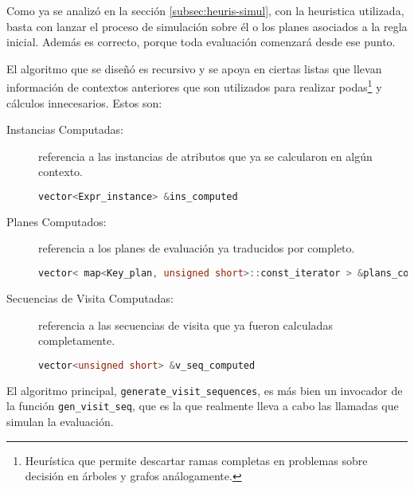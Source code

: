 Como ya se analizó en la sección \ref{subsec:heuris-simul}, con la heuristica utilizada,  basta con lanzar el proceso de simulación sobre él o los planes asociados a la regla inicial. Además es correcto, porque toda evaluación comenzará desde ese punto.

El algoritmo que se diseñó es recursivo y se apoya en ciertas listas que llevan información de contextos anteriores que son utilizados para realizar podas\footnote{Heurística que permite descartar ramas completas en problemas sobre decisión en árboles y grafos análogamente. } y cálculos innecesarios. Estos son:

\begin{description}
\item [Instancias Computadas:] referencia a las instancias de atributos que ya se calcularon en algún contexto.
\begin{lstlisting}[language=C++, basicstyle=\scriptsize]
vector<Expr_instance> &ins_computed
\end{lstlisting}

\item [Planes Computados:] referencia a los planes de evaluación ya traducidos por completo.
\begin{lstlisting}[language=C++, basicstyle=\scriptsize]
vector< map<Key_plan, unsigned short>::const_iterator > &plans_computed
\end{lstlisting}

\item [Secuencias de Visita Computadas:] referencia a las secuencias de visita que ya fueron calculadas completamente.
\begin{lstlisting}[language=C++, basicstyle=\scriptsize]
vector<unsigned short> &v_seq_computed
\end{lstlisting}
\end{description}

El algoritmo principal, \texttt{generate\_visit\_sequences}, es más bien un invocador de la función \texttt{gen\_visit\_seq}, que es la que realmente lleva a cabo las llamadas que simulan la evaluación.

